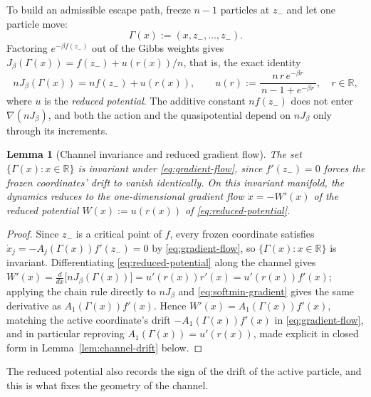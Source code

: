 \documentclass{article}
\theoremstyle{plain}
\newtheorem{lemma}[theorem]{Lemma}
\theoremstyle{definition}
\theoremstyle{remark}
\newcommand{\prefactor}[2]{A_{#1}(#2)}
\newcommand{\R}{\mathbb{R}}
\begin{document}
To build an admissible escape path, freeze $n-1$ particles at $z_-$ and let one particle move:
\begin{equation}
    \Gamma(x):=(x,z_-,\dots,z_-).
    \label{eq:channel}
\end{equation}
Factoring $e^{-\beta f(z_-)}$ out of the Gibbs weights gives $J_\beta(\Gamma(x))=f(z_-)+u(r(x))/n$, that is, the exact identity
\begin{equation}
    nJ_\beta(\Gamma(x))=nf(z_-)+u(r(x)), \qquad u(r):=\frac{n\,r\,e^{-\beta r}}{\,n-1+e^{-\beta r}\,}, \quad r\in\R,
    \label{eq:reduced-potential}
\end{equation}
where $u$ is the \emph{reduced potential}. The additive constant $nf(z_-)$ does not enter $\nabla(nJ_\beta)$, and both the action and the quasipotential depend on $nJ_\beta$ only through its increments.

\begin{lemma}[Channel invariance and reduced gradient flow]
\label{lem:channel-invariant}
The set $\{\Gamma(x):x\in\R\}$ is invariant under \eqref{eq:gradient-flow}, since $f'(z_-)=0$ forces the frozen coordinates' drift to vanish identically. On this invariant manifold, the dynamics reduces to the one-dimensional gradient flow $\dot x=-W'(x)$ of the reduced potential $W(x):=u(r(x))$ of \eqref{eq:reduced-potential}.
\end{lemma}

\begin{proof}
Since $z_-$ is a critical point of $f$, every frozen coordinate satisfies $\dot x_j=-\prefactor{j}{\Gamma(x)}f'(z_-)=0$ by \eqref{eq:gradient-flow}, so $\{\Gamma(x):x\in\R\}$ is invariant. Differentiating \eqref{eq:reduced-potential} along the channel gives $W'(x)=\frac{d}{dx}\bigl[nJ_\beta(\Gamma(x))\bigr]=u'(r(x))r'(x)=u'(r(x))f'(x)$; applying the chain rule directly to $nJ_\beta$ and \eqref{eq:softmin-gradient} gives the same derivative as $\prefactor{1}{\Gamma(x)}f'(x)$. Hence $W'(x)=\prefactor{1}{\Gamma(x)}f'(x)$, matching the active coordinate's drift $-\prefactor{1}{\Gamma(x)}f'(x)$ in \eqref{eq:gradient-flow}, and in particular reproving $\prefactor{1}{\Gamma(x)}=u'(r(x))$, made explicit in closed form in Lemma~\ref{lem:channel-drift} below.
\end{proof}

The reduced potential also records the sign of the drift of the active particle, and this is what fixes the geometry of the channel.
\end{document}

